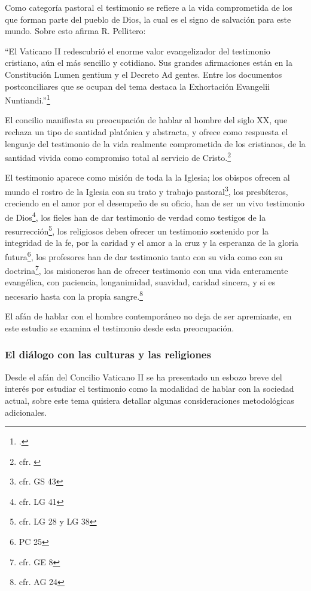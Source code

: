 \documentclass[12pt]{article}
\begin{document}
{Como categoría pastoral el testimonio se refiere a la vida comprometida de los que forman parte del pueblo de Dios, la cual es el signo de salvación para este mundo. Sobre esto afirma R. Pellitero:

``El Vaticano II redescubrió el enorme valor evangelizador del testimonio cristiano, aún el más sencillo y cotidiano. Sus grandes afirmaciones están en la Constitución Lumen gentium y el Decreto Ad gentes. Entre los documentos postconciliares que se ocupan del tema destaca la Exhortación Evangelii Nuntiandi.''\footcite[pp.~378--379]{ftcpellitero}

El concilio manifiesta su preocupación de hablar al hombre del siglo XX, que rechaza un tipo de santidad platónica y abstracta, y ofrece como respuesta el lenguaje del testimonio de la vida realmente comprometida de los cristianos, de la santidad vivida como compromiso total al servicio de Cristo.\footnote{cfr. \cite[p.~1532 y 1533]{dicctf}} 

El testimonio aparece como misión de toda la la Iglesia; los obispos ofrecen al mundo el rostro de la Iglesia con su trato y trabajo pastoral\footnote{cfr. GS 43}, los presbíteros, creciendo en el amor por el desempeño de su oficio, han de ser un vivo testimonio de Dios\footnote{cfr. LG 41}, los fieles han de dar testimonio de verdad como testigos de la resurrección\footnote{cfr. LG 28 y LG 38}, los religiosos deben ofrecer un testimonio sostenido por la integridad de la fe, por la caridad y el amor a la cruz y la esperanza de la gloria futura\footnote{PC 25}, los profesores han de dar testimonio tanto con su vida como con su doctrina\footnote{cfr. GE 8}, los misioneros han de ofrecer testimonio con una vida enteramente evangélica, con paciencia, longanimidad, suavidad, caridad sincera, y si es necesario hasta con la propia sangre.\footnote{cfr. AG 24}

El afán de hablar con el hombre contemporáneo no deja de ser apremiante, en este estudio se examina el testimonio desde esta preocupación. 

\subsubsection{El diálogo con las culturas y las religiones}
Desde el afán del Concilio Vaticano II se ha presentado un esbozo breve del interés por estudiar el testimonio como la modalidad de hablar con la sociedad actual, sobre este tema quisiera detallar algunas consideraciones metodológicas adicionales.

}
\end{document}
